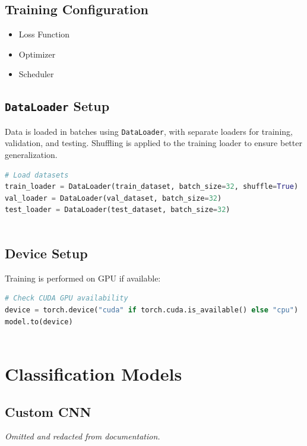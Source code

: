 \subsection{Training Configuration}

\begin{itemize}
	\item Loss Function
	\item Optimizer
	\item Scheduler
\end{itemize}

\subsection{\texttt{DataLoader} Setup}

Data is loaded in batches using \texttt{DataLoader}, with separate loaders for training, validation, and testing. Shuffling is applied to the training loader to ensure better generalization.

\begin{lstlisting}[language=Python]
# Load datasets
train_loader = DataLoader(train_dataset, batch_size=32, shuffle=True)
val_loader = DataLoader(val_dataset, batch_size=32)
test_loader = DataLoader(test_dataset, batch_size=32)
	
\end{lstlisting}

\subsection{Device Setup}

Training is performed on GPU if available:

\begin{lstlisting}[language=Python]
# Check CUDA GPU availability
device = torch.device("cuda" if torch.cuda.is_available() else "cpu")
model.to(device)
	
\end{lstlisting}

\section{Classification Models}

\subsection{Custom CNN}

\textit{Omitted and redacted from documentation.}

